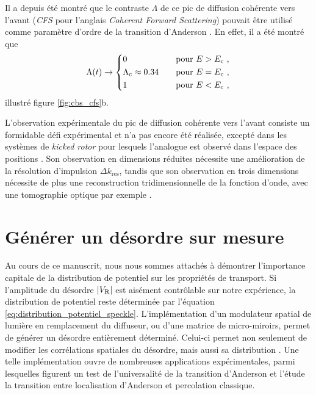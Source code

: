 Il a depuis été montré que le contraste $\Lambda$ de ce pic de diffusion cohérente vers l'avant (\emph{CFS} pour l'anglais \emph{Coherent Forward Scattering}) pouvait être utilisé comme paramètre d'ordre de la transition d'Anderson \citep{ghosh2017coherent}. En effet, il a été montré que 
\begin{equation}
\Lambda(t) \rightarrow \left\lbrace \begin{aligned}
& 0  \quad &&\text{pour } E>E_{\mathrm{c}} \text{ ,}\\
& \Lambda_{\mathrm{c}}\approx 0.34 \quad &&\text{pour } E=E_{\mathrm{c}} \text{ ,}\\
& 1 \quad &&\text{pour } E<E_{\mathrm{c}} \text{ ,}
\end{aligned}\right.
\label{eq:contraste_cfs}
\end{equation}
illustré figure \ref{fig:cbs_cfs}b.

L'observation expérimentale du pic de diffusion cohérente vers l'avant consiste un formidable défi expérimental et n'a pas encore été réalisée, excepté dans les systèmes de \emph{kicked rotor} pour lesquels l'analogue est observé dans l'espace des positions \citep{hainaut2018controlling}. Son observation en dimensions réduites nécessite une amélioration de la résolution d'impulsion $\Delta k_{\mathrm{res}}$, tandis que son observation en trois dimensions nécessite de plus une reconstruction tridimensionnelle de la fonction d'onde, avec une tomographie optique par exemple \citep{brantut2008light}. 







\section{Générer un désordre sur mesure} 
Au cours de ce manuscrit, nous nous sommes attachés à démontrer l'importance capitale de la distribution de potentiel sur les propriétés de transport. Si l'amplitude du désordre $|V_{\mathrm{R}}|$ est aisément contrôlable sur notre expérience, la distribution de potentiel reste déterminée par l'équation \ref{eq:distribution_potentiel_speckle}. L'implémentation d'un modulateur spatial de lumière en remplacement du diffuseur, ou d'une matrice de micro-miroirs, permet de générer un désordre entièrement déterminé. Celui-ci permet non seulement de modifier les corrélations spatiales du désordre, mais aussi sa distribution \citep{bender2018customizing}. Une telle implémentation ouvre de nombreuses applications expérimentales, parmi lesquelles figurent un test de l'universalité de la transition d'Anderson et l'étude la transition entre localisation d'Anderson et percolation classique. 

